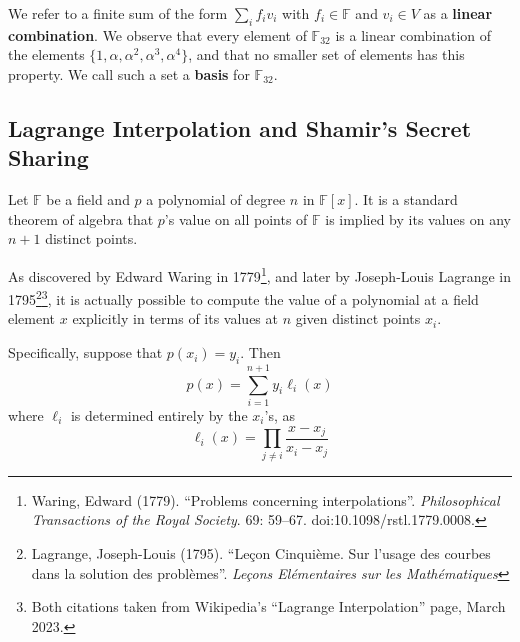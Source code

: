 \documentclass[letterpaper]{article}
\newcommand{\fttwo}{\mathbb{F}_{32}}
\begin{document}
We refer to a finite sum of the form $\sum_i f_{i}v_i$ with $f_i\in \mathbb{F}$ and
$v_i\in V$ as a \textbf{linear combination}. We observe that every element
of $\fttwo$ is a linear combination of the elements $\{1,\alpha,\alpha^2,
\alpha^3,\alpha^4\}$, and that no smaller set of elements has this property.
We call such a set a \textbf{basis} for $\fttwo$.

\subsection{Lagrange Interpolation and Shamir's Secret Sharing\label{sec:sss}}

Let $\mathbb{F}$ be a field and $p$ a polynomial of degree $n$ in $\mathbb{F}[x]$. It is a
standard theorem of algebra that $p$'s value on all points of $\mathbb{F}$ is
implied by its values on any $n+1$ distinct points.

As discovered by Edward Waring in
1779\footnote{Waring, Edward (1779). ``Problems concerning interpolations''.
\emph{Philosophical Transactions of the Royal Society}. 69: 59–67.
doi:10.1098/rstl.1779.0008.},
and later by Joseph-Louis Lagrange in 1795\footnote{Lagrange, Joseph-Louis (1795).
``Leçon Cinquième. Sur l'usage des courbes dans la solution des problèmes''.
\emph{Leçons Elémentaires sur les Mathématiques}}\footnote{Both citations taken
from Wikipedia's ``Lagrange Interpolation'' page, March 2023.},
it is actually possible to compute
the value of a polynomial at a field element $x$ explicitly in terms of
its values at $n$ given distinct points $x_i$.

Specifically, suppose that $p(x_i) = y_i$. Then
\begin{equation}
 p(x) = \sum_{i=1}^{n+1} y_i \ell_i(x) \label{eq:linterp}
\end{equation}
where $\ell_i$ is determined entirely by the $x_i$'s, as
\[ \ell_i(x) = \prod_{j\neq i} \frac{x - x_j}{x_i - x_j} \]
\end{document}
